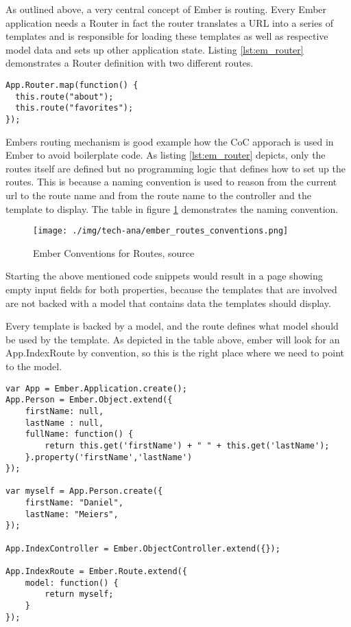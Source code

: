 As outlined above, a very central concept of Ember is routing.
Every Ember application needs a Router in fact the router translates a URL into a series of templates and is responsible for loading these templates as well as respective model data and sets up other application state.
Listing \ref{lst:em_router} demonstrates a Router definition with two different routes.

\begin{lstlisting}[label=lst:em_router,caption=Router Defintion in Ember]
App.Router.map(function() {
  this.route("about");
  this.route("favorites");
});
\end{lstlisting}

Embers routing mechanism is good example how the CoC apporach is used in Ember to avoid boilerplate code. As listing \ref{lst:em_router} depicts, only the routes itself are defined but no programming logic that defines how to set up the routes. 
This is because a naming convention is used to reason from the current url to the route name and from the route name to the controller and the template to display.
The table in figure \ref{fig:ember_routes} demonstrates the naming convention.

\begin{figure}
	\centering	\texttt{[image: ./img/tech-ana/ember\_routes\_conventions.png]}
	\caption{Ember Conventions for Routes, source \autocite{tech-ana:em-routes-coc}}
	\label{fig:ember_routes}
\end{figure}

Starting the above mentioned code snippets would result in a page showing empty input fields for both properties, because the templates that are involved are not backed with a model that contains data the templates should display.

Every template is backed by a model, and the route defines what model should be used by the template.
As depicted in the table above, ember will look for an App.IndexRoute by convention, so this is the right place where we need to point to the model.

\begin{lstlisting}[label=em_controller,caption=app.js]
var App = Ember.Application.create();
App.Person = Ember.Object.extend({
	firstName: null,
	lastName : null,
    fullName: function() {
        return this.get('firstName') + " " + this.get('lastName');
    }.property('firstName','lastName')
});

var myself = App.Person.create({
    firstName: "Daniel",
    lastName: "Meiers",
});

App.IndexController = Ember.ObjectController.extend({});

App.IndexRoute = Ember.Route.extend({
    model: function() {
        return myself;
    }
});
\end{lstlisting}

